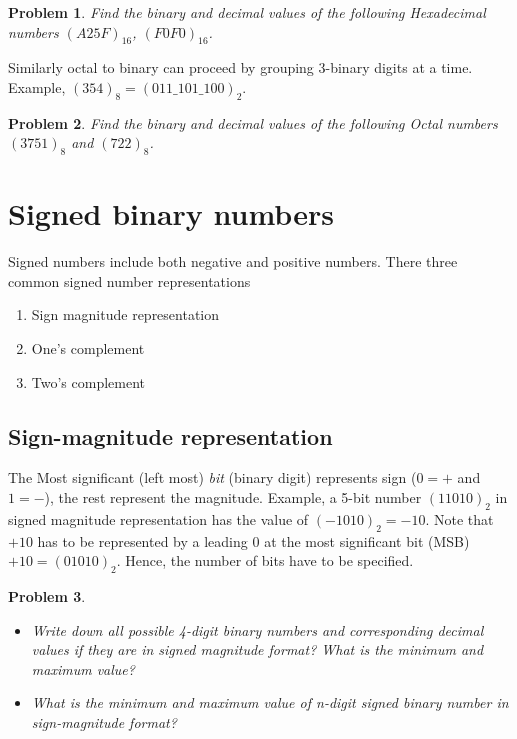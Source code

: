 \documentclass{article}
\newtheorem{prob}{Problem}
\begin{document}
\begin{prob}
  Find the binary and decimal values of the following Hexadecimal numbers
  $(A25F)_{16}$, $(F0F0)_{16}$.
\end{prob}
\vspace{10em}



Similarly octal to binary can proceed by grouping 3-binary digits at a time.
Example, $(354)_8 = (011\_101\_100)_2$.

\begin{prob}
  Find the binary and decimal values of the following Octal numbers
  $(3751)_8$ and $(722)_8$.
\end{prob}
\vspace{10em}

\section{Signed binary numbers}

Signed numbers include both negative and positive numbers. There three common
signed number representations

\begin{enumerate}
\item Sign magnitude representation
\item One's complement
\item Two's complement
\end{enumerate}
  
\subsection{Sign-magnitude representation}
The Most significant (left most) \emph{bit} (binary digit) represents sign ($0 =
+$ and $1 = -$), the rest represent the magnitude. Example, a 5-bit number
$(11010)_2$ in signed magnitude representation has the value of $(-1010)_2 =
-10$. Note that $+10$ has to be represented by a leading $0$ at the most
significant bit (MSB) $+10 = (01010)_2$. Hence, the number of bits have to be specified.

\begin{prob}
  \begin{itemize}
\item Write down all possible 4-digit binary numbers and corresponding decimal
  values if they are in signed magnitude format? What is the minimum and maximum value?
  \item What is the minimum and maximum value of n-digit signed binary number in
    sign-magnitude format?
\end{itemize}
\end{prob}
\vspace{20em}
\end{document}
